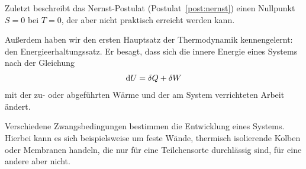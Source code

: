 \begin{summary}
    Zuletzt beschreibt das Nernst-Postulat (Postulat~\ref{post:nernst}) einen Nullpunkt $S=0$ bei $T=0$, der aber nicht praktisch erreicht werden kann. 

    Außerdem haben wir den ersten Hauptsatz der Thermodynamik kennengelernt: den Energieerhaltungssatz. Er besagt, dass sich die innere Energie eines Systems nach der Gleichung 
    \begin{align*}
        \mathop{}\!\mathrm{d} U = \mathop{}\!\delta Q + \mathop{}\!\delta W
    \end{align*}
    mit der zu- oder abgeführten Wärme und der am System verrichteten Arbeit ändert. 


    Verschiedene Zwangsbedingungen bestimmen die Entwicklung eines Systems. Hierbei kann es sich beispielsweise um feste Wände, thermisch isolierende Kolben oder Membranen handeln, die nur für eine Teilchensorte durchlässig sind, für eine andere aber nicht. 
\end{summary}